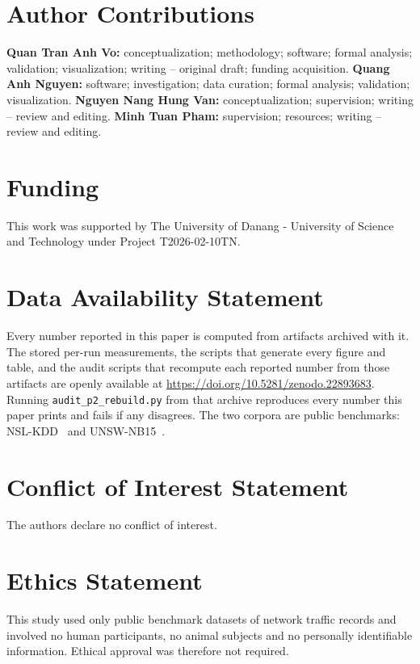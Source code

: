 \documentclass[journal]{IEEEtran}
\begin{document}
\section*{Author Contributions}
\textbf{Quan Tran Anh Vo:} conceptualization; methodology; software; formal
analysis; validation; visualization; writing -- original draft; funding
acquisition. \textbf{Quang Anh Nguyen:} software; investigation; data
curation; formal analysis; validation; visualization. \textbf{Nguyen Nang
Hung Van:} conceptualization; supervision; writing -- review and editing.
\textbf{Minh Tuan Pham:} supervision; resources; writing -- review and
editing.

\section*{Funding}
This work was supported by The University of Danang - University of Science
and Technology under Project T2026-02-10TN.

\section*{Data Availability Statement}
Every number reported in this paper is computed from artifacts archived with
it. The stored per-run measurements, the scripts that generate every figure
and table, and the audit scripts that recompute each reported number from
those artifacts are openly available at
\url{https://doi.org/10.5281/zenodo.22893683}. Running
\texttt{audit\_p2\_rebuild.py} from that archive reproduces every number
this paper prints and fails if any disagrees. The two corpora are public
benchmarks: NSL-KDD~\cite{tavallaee2009nslkdd} and
UNSW-NB15~\cite{moustafa2015unsw}.

\section*{Conflict of Interest Statement}
The authors declare no conflict of interest.

\section*{Ethics Statement}
This study used only public benchmark datasets of network traffic records and
involved no human participants, no animal subjects and no personally
identifiable information. Ethical approval was therefore not required.

\end{document}

